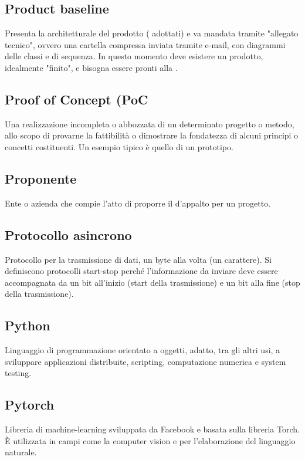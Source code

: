 \subsection*{Product baseline}
Presenta la  architetturale del prodotto ( adottati) e va mandata tramite "allegato tecnico", ovvero una cartella compressa inviata tramite e-mail, con diagrammi delle classi e di sequenza. In questo momento deve esistere un prodotto, idealmente "finito", e bisogna essere pronti alla .

\subsection*{Proof of Concept (PoC}
Una realizzazione incompleta o abbozzata di un determinato progetto o metodo, allo scopo di provarne la fattibilità o dimostrare la fondatezza di alcuni principi o concetti costituenti. Un esempio tipico è quello di un prototipo. 

\subsection*{Proponente}
Ente o azienda che compie l'atto di proporre il  d'appalto per un progetto.

\subsection*{Protocollo asincrono}
Protocollo per la trasmissione di dati, un byte alla volta (un carattere). Si definiscono protocolli start-stop perché l'informazione da inviare deve essere accompagnata da un bit all'inizio (start della trasmissione) e un bit alla fine (stop della trasmissione).

\subsection*{Python}
Linguaggio di programmazione orientato a oggetti, adatto, tra gli altri usi, a sviluppare applicazioni distribuite, scripting, computazione numerica e system testing.

\subsection*{Pytorch}
Libreria  di machine-learning sviluppata da Facebook e basata sulla libreria Torch. È utilizzata in campi come la computer vision e per l'elaborazione del linguaggio naturale.

